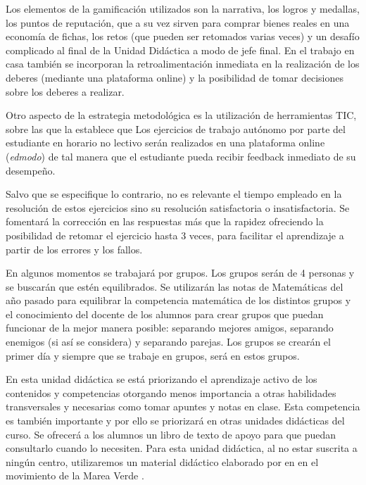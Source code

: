 Los elementos de la gamificación utilizados son la narrativa, los logros y medallas, los puntos de reputación, que a su vez sirven para comprar bienes reales en una economía de fichas, los retos (que pueden ser retomados varias veces) y un desafío complicado al final de la Unidad Didáctica a modo de jefe final.
%
En el trabajo en casa también se incorporan la retroalimentación inmediata en la realización de los deberes (mediante una plataforma online) y la posibilidad de tomar decisiones sobre los deberes a realizar.

Otro aspecto de la estrategia metodológica es la utilización de herramientas \gls{TIC}, sobre las que la \lomce establece que 
%
Los ejercicios de trabajo autónomo por parte del estudiante en horario no lectivo serán realizados en una plataforma online (\textit{edmodo}) de tal manera que el estudiante pueda recibir feedback inmediato de su desempeño.

Salvo que se especifique lo contrario, no es relevante el tiempo empleado en la resolución de estos ejercicios sino su resolución satisfactoria o insatisfactoria.
%
Se fomentará la corrección en las respuestas más que la rapidez ofreciendo la posibilidad de retomar el ejercicio hasta 3 veces, para facilitar el aprendizaje a partir de los errores y los fallos.

En algunos momentos se trabajará por grupos.
%
Los grupos serán de 4 personas y se buscarán que estén equilibrados.
%
Se utilizarán las notas de Matemáticas del año pasado para equilibrar la competencia matemática de los distintos grupos y el conocimiento del docente de los alumnos para crear grupos que puedan funcionar de la mejor manera posible: separando mejores amigos, separando enemigos (si así se considera) y separando parejas.
%
\label{grupos}
%
Los grupos se crearán el primer día y siempre que se trabaje en grupos, será en estos grupos.

En esta unidad didáctica se está priorizando el aprendizaje activo de los contenidos y competencias otorgando menos importancia a otras habilidades transversales y necesarias como tomar apuntes y notas en clase. 
%
Esta competencia es también importante y por ello se priorizará en otras unidades didácticas del curso. 
%
Se ofrecerá a los alumnos un libro de texto de apoyo para que puedan consultarlo cuando lo necesiten.
%
Para esta unidad didáctica, al no estar suscrita a ningún centro, utilizaremos un material didáctico elaborado por \citeauthor{MareaVerde} en \citeyear{MareaVerde} en el movimiento de la Marea Verde \citep{MareaVerde}.


